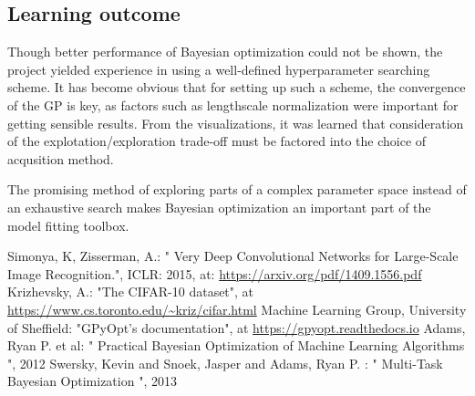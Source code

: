 \documentclass[12pt,fleqn]{article}
\begin{document}
\begin{multicols}{2}
\section{Learning outcome}

Though better performance of Bayesian optimization could not be shown, the project yielded experience in using a well-defined hyperparameter searching scheme. It has become obvious that for setting up such a scheme, the convergence of the GP is key, as factors such as lengthscale normalization were important for getting sensible results. From the visualizations, it was learned that consideration of the explotation/exploration trade-off must be factored into the choice of acqusition method.

The promising method of exploring parts of a complex parameter space instead of an exhaustive search makes Bayesian optimization an important part of the model fitting toolbox.


\end{multicols}

\begin{thebibliography}{9}
	 Simonya, K, Zisserman, A.: " Very Deep Convolutional Networks for Large-Scale Image Recognition.", ICLR: 2015, at: \url{https://arxiv.org/pdf/1409.1556.pdf}
	 Krizhevsky, A.: "The CIFAR-10 dataset", at \url{https://www.cs.toronto.edu/~kriz/cifar.html}
	 Machine Learning Group, University of Sheffield: "GPyOpt’s documentation", at \url{https://gpyopt.readthedocs.io}
	 Adams, Ryan P. et al: " Practical Bayesian Optimization of Machine Learning Algorithms ", 2012
	 Swersky, Kevin and Snoek, Jasper and Adams, Ryan P. : " Multi-Task Bayesian Optimization ", 2013
\end{thebibliography}
\end{document}
